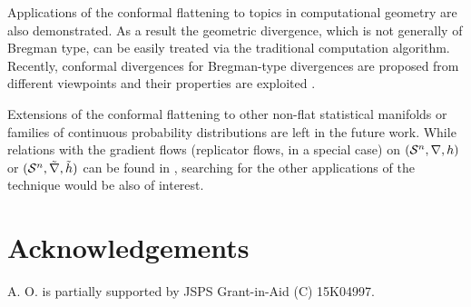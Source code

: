 \documentclass{llncs}
\begin{document}
Applications of the conformal flattening to topics in computational geometry 
are also demonstrated.
As a result the geometric divergence, 
which is not generally of Bregman type, 
can be easily treated via the traditional computation algorithm. 
Recently, conformal divergences for Bregman-type divergences are 
proposed from different viewpoints 
and their properties are exploited \cite{NN15,NNA16}.

Extensions of the conformal flattening to other non-flat statistical manifolds 
or families of continuous probability distributions 
are left in the future work.
While relations with the gradient flows (replicator flows, in a special case) 
on $({\cal S}^n,\nabla,h)$ or $({\cal S}^n,\tilde \nabla, \tilde h)$ 
can be found in \cite{Ohara18}, searching for the other applications 
of the technique would be also of interest.




%
%
\section*{Acknowledgements}
A. O. is partially supported by JSPS Grant-in-Aid (C) 15K04997.
\end{document}
